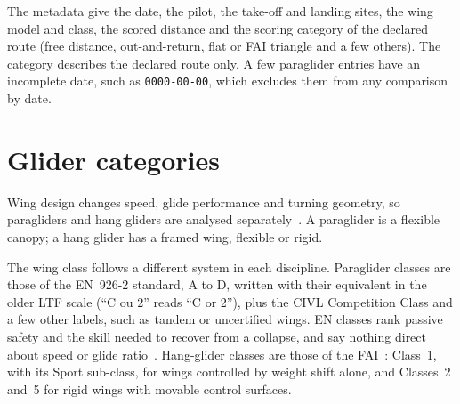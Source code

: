 The metadata give the date, the pilot, the take-off and landing sites, the wing
model and class, the scored distance and the scoring category of the declared route
(free distance, out-and-return, flat or FAI triangle and a few others). The category
describes the declared route only. A few paraglider entries have an incomplete date,
such as \texttt{0000-00-00}, which excludes them from any comparison by date.

\section{Glider categories}
\label{sec:glider}

Wing design changes speed, glide performance and turning geometry, so paragliders and
hang gliders are analysed separately~\cite{vilpellet2026}. A paraglider is a flexible
canopy; a hang glider has a framed wing, flexible or rigid.

The wing class follows a different system in each discipline. Paraglider classes are
those of the EN~926-2 standard, A to D, written with their equivalent in the older LTF
scale (\enquote{C ou 2} reads \enquote{C or 2}), plus the CIVL Competition Class and a
few other labels, such as tandem or uncertified wings. EN classes rank passive
safety and the skill needed to recover from a collapse, and say nothing direct about speed or glide
ratio~\cite{fpren926_2_2012}. Hang-glider classes are those of the
FAI~\cite{fai_sc7_2024}: Class~1, with its Sport sub-class, for wings controlled
by weight shift alone, and Classes~2 and~5 for rigid wings with movable control
surfaces.
